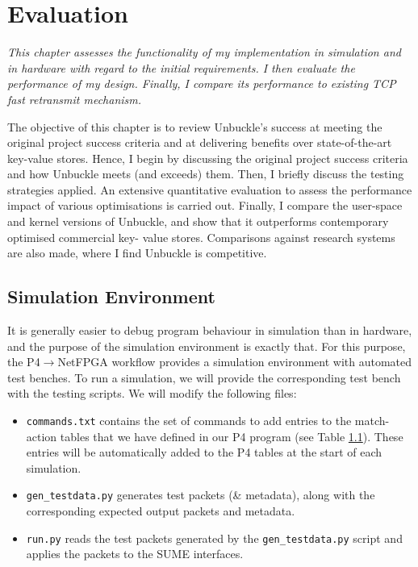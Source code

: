 \chapter{Evaluation}
\textit{This chapter assesses the functionality of my implementation in simulation and in hardware with regard to the initial requirements. I then evaluate the performance of my design. Finally, I compare its performance to existing TCP fast retransmit mechanism.}

The objective of this chapter is to review Unbuckle’s success at meeting the original project success criteria and at delivering benefits over state-of-the-art key-value stores. Hence, I begin by discussing the original project success criteria and how Unbuckle meets (and exceeds) them. Then, I briefly discuss the testing strategies applied. An extensive quantitative evaluation to assess the performance impact of various optimisations is carried out. Finally, I compare the user-space and kernel versions of Unbuckle, and show that it outperforms contemporary optimised commercial key- value stores. Comparisons against research systems are also made, where I find Unbuckle is competitive.

\section{Simulation Environment}
It is generally easier to debug program behaviour in simulation than in hardware, and the purpose of the simulation environment is exactly that. For this purpose, the P4$\rightarrow$NetFPGA workflow provides a simulation environment with automated test benches. To run a simulation, we will provide the corresponding test bench with the testing scripts. We will modify the following files:

\begin{itemize}
	\item \texttt{commands.txt} contains the set of commands to add entries to the match-action tables that we have defined in our P4 program (see Table \ref{}). These entries will be automatically added to the P4 tables at the start of each simulation. 
	\item \texttt{gen\_testdata.py} generates test packets (\& metadata), along with the corresponding expected output packets and metadata.
	\item \texttt{run.py} reads the test packets generated by the \texttt{gen\_testdata.py} script and applies the packets to the SUME interfaces.
\end{itemize}

